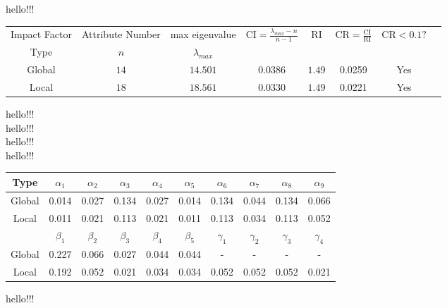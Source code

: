 \documentclass[12pt]{article}
\begin{document}
		hello!!! \\

		{
			\fontsize{10}{14}\selectfont
			{
				\begin{longtable}{cccccccc}
					\toprule
					Impact Factor&Attribute Number&max eigenvalue 
					&\multirow{2}{*}{$\mathrm{CI}=\frac{\lambda_{max}-n}{n-1}$}
					&\multirow{2}{*}{$\mathrm{RI}$}
					&\multirow{2}{*}{$\mathrm{CR}=\frac{\mathrm{CI}}{\mathrm{RI}}$}
					&\multirow{2}{*}{$\mathrm{CR}<0.1?$}\\
					Type&$n$&$\lambda_{max}$\\
					\toprule
					Global&$14$&$14.501$&$0.0386$&$1.49$&0.0259&Yes\\
					Local&$18$&$18.561$&$0.0330$&$1.49$&0.0221&Yes\\
					\bottomrule
				\end{longtable}
			}
		}	

	hello!!! \\
	hello!!! \\
	hello!!! \\
	hello!!! \\
	
		{
			\fontsize{10}{14}\selectfont
			{
				\begin{longtable}{c|ccccccccc}
					\toprule
					Type&$\alpha_1$&$\alpha_2$&$\alpha_3$&$\alpha_4$&$\alpha_5$&$\alpha_6$&$\alpha_7$&$\alpha_8$&$\alpha_9$\\
					\toprule
					Global&0.014&0.027&0.134&0.027&0.014&0.134&0.044&0.134&0.066\\
					Local&0.011&0.021&0.113&0.021&0.011&0.113&0.034&0.113&0.052\\
					\toprule
					\toprule
					&$\beta_1$&$\beta_2$&$\beta_3$&$\beta_4$&$\beta_5$&$\gamma_1$&$\gamma_2$&$\gamma_3$&$\gamma_4$\\
					\toprule
					Global&0.227&0.066&0.027&0.044&0.044&-&-&-&-\\
					Local&0.192&0.052&0.021&0.034&0.034&0.052&0.052&0.052&0.021\\
					\bottomrule
				\end{longtable}
			}
		}	
	
		hello!!! \\
		
\end{document}

